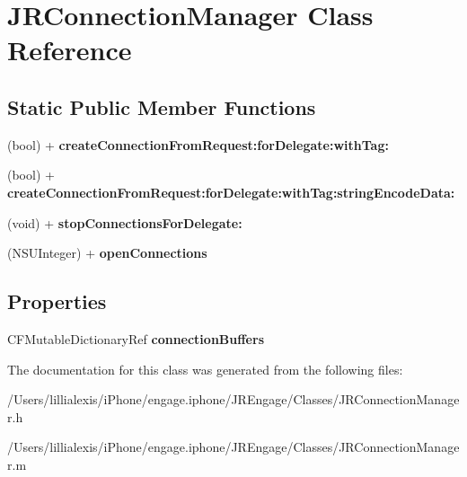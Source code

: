 \hypertarget{interface_j_r_connection_manager}{
\section{JRConnectionManager Class Reference}
\label{interface_j_r_connection_manager}
}
\subsection*{Static Public Member Functions}
\begin{DoxyCompactItemize}
\item 
\hypertarget{interface_j_r_connection_manager_ae4e91152598667dac3fb81dab27e0937}{
(bool) + {\bfseries createConnectionFromRequest:forDelegate:withTag:}}
\label{interface_j_r_connection_manager_ae4e91152598667dac3fb81dab27e0937}

\item 
\hypertarget{interface_j_r_connection_manager_a0b05c2180eaa13a2b73774bf24a3882a}{
(bool) + {\bfseries createConnectionFromRequest:forDelegate:withTag:stringEncodeData:}}
\label{interface_j_r_connection_manager_a0b05c2180eaa13a2b73774bf24a3882a}

\item 
\hypertarget{interface_j_r_connection_manager_aa2dc4d19438271a8755667b740c2a334}{
(void) + {\bfseries stopConnectionsForDelegate:}}
\label{interface_j_r_connection_manager_aa2dc4d19438271a8755667b740c2a334}

\item 
\hypertarget{interface_j_r_connection_manager_a6748f5924b23475b527f2fd650c05cb0}{
(NSUInteger) + {\bfseries openConnections}}
\label{interface_j_r_connection_manager_a6748f5924b23475b527f2fd650c05cb0}

\end{DoxyCompactItemize}
\subsection*{Properties}
\begin{DoxyCompactItemize}
\item 
\hypertarget{interface_j_r_connection_manager_a156cef530bb2c62e78a88f6ea1c03ca4}{
CFMutableDictionaryRef {\bfseries connectionBuffers}}
\label{interface_j_r_connection_manager_a156cef530bb2c62e78a88f6ea1c03ca4}

\end{DoxyCompactItemize}


The documentation for this class was generated from the following files:\begin{DoxyCompactItemize}
\item 
/Users/lillialexis/iPhone/engage.iphone/JREngage/Classes/JRConnectionManager.h\item 
/Users/lillialexis/iPhone/engage.iphone/JREngage/Classes/JRConnectionManager.m\end{DoxyCompactItemize}
